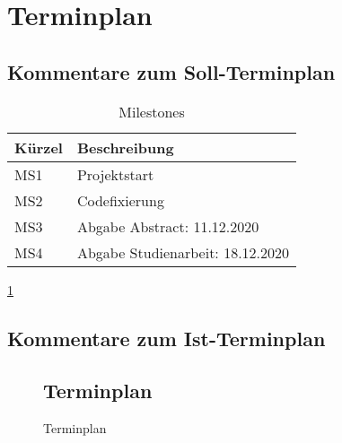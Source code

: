\section{Terminplan}\label{sec:terminplan}
\subsection{Kommentare zum Soll-Terminplan}

\begin{table}[!h]
	\centering
	\begin{tabular}{p{2cm}p{6cm}}
		\toprule
		\textbf{Kürzel}& \textbf{Beschreibung}\\\midrule
		MS1 & Projektstart\\
		MS2 & Codefixierung\\
		MS3 & Abgabe Abstract: 11.12.2020\\
		MS4 & Abgabe Studienarbeit: 18.12.2020\\\bottomrule
	\end{tabular}
	\caption{Milestones}
	\label{tab:milestones}	
\end{table}

\cref{tab:milestones}

\subsection{Kommentare zum Ist-Terminplan}

\newpage
\begin{sidewaysfigure}[h!]
	\subsection{Terminplan}
	\centering
	\caption{Terminplan}
\end{sidewaysfigure}

